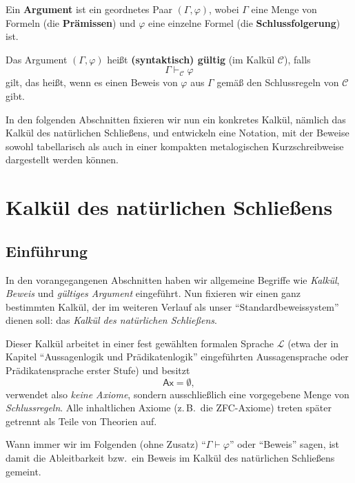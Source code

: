 \documentclass[main.tex]{subfiles}
\begin{document}
\begin{definition}
Ein \textbf{Argument} ist ein geordnetes Paar \((\Gamma,\varphi)\),
wobei \(\Gamma\) eine Menge von Formeln (die \textbf{Prämissen})
und \(\varphi\) eine einzelne Formel (die \textbf{Schlussfolgerung})
ist.

Das Argument \((\Gamma,\varphi)\) heißt \textbf{(syntaktisch)
gültig} (im Kalkül \(\mathcal C\)), falls
\[
  \Gamma \vdash_{\mathcal C} \varphi
\]
gilt, das heißt, wenn es einen Beweis von \(\varphi\) aus \(\Gamma\)
gemäß den Schlussregeln von \(\mathcal C\) gibt.
\end{definition}

In den folgenden Abschnitten fixieren wir nun ein konkretes Kalkül,
nämlich das Kalkül des natürlichen Schließens, und entwickeln eine
Notation, mit der Beweise sowohl tabellarisch als auch in einer
kompakten metalogischen Kurzschreibweise dargestellt werden können.

\section{Kalkül des natürlichen Schließens}

\subsection{Einführung}

In den vorangegangenen Abschnitten haben wir allgemeine Begriffe wie
\emph{Kalkül}, \emph{Beweis} und \emph{gültiges Argument} eingeführt.
Nun fixieren wir einen ganz bestimmten Kalkül, der im weiteren Verlauf
als unser \enquote{Standardbeweissystem} dienen soll: das
\emph{Kalkül des natürlichen Schließens}.

Dieser Kalkül arbeitet in einer fest gewählten formalen Sprache
\(\mathcal L\) (etwa der in Kapitel \enquote{Aussagenlogik und
Prädikatenlogik} eingeführten Aussagensprache oder
Prädikatensprache erster Stufe) und besitzt
\[
  \mathsf{Ax} = \emptyset,
\]
verwendet also \emph{keine Axiome}, sondern ausschließlich eine
vorgegebene Menge von \emph{Schlussregeln}. Alle inhaltlichen Axiome
(z.\,B.\ die ZFC-Axiome) treten später getrennt als Teile von
Theorien auf.

Wann immer wir im Folgenden (ohne Zusatz) \enquote{\(\Gamma \vdash \varphi\)}
oder \enquote{Beweis} sagen, ist damit die Ableitbarkeit bzw.\ ein Beweis
im Kalkül des natürlichen Schließens gemeint.
\end{document}
